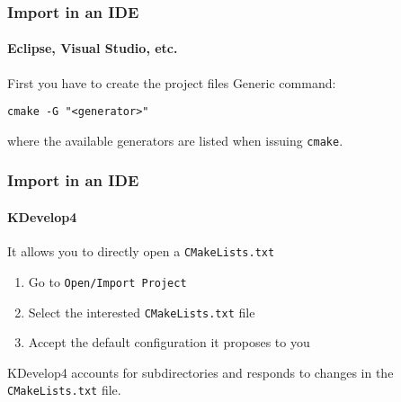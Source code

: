 \begin{frame}
\frametitle{Import in an IDE}
\framesubtitle{Eclipse, Visual Studio, etc.}

\begin{block}{First you have to create the project files}
Generic command:

\medskip

\texttt{cmake -G "<generator>"}

\medskip

where the available generators are listed when issuing \texttt{cmake}.
\end{block}

\end{frame}

\begin{frame}
\frametitle{Import in an IDE}
\framesubtitle{KDevelop4}

\begin{block}{It allows you to directly open a \texttt{CMakeLists.txt}}
\begin{enumerate}
\item Go to \texttt{Open/Import Project}
\item Select the interested \texttt{CMakeLists.txt} file
\item Accept the default configuration it proposes to you
\end{enumerate}
KDevelop4 accounts for subdirectories and responds to changes in the \texttt{CMakeLists.txt} file.
\end{block}

\end{frame}

